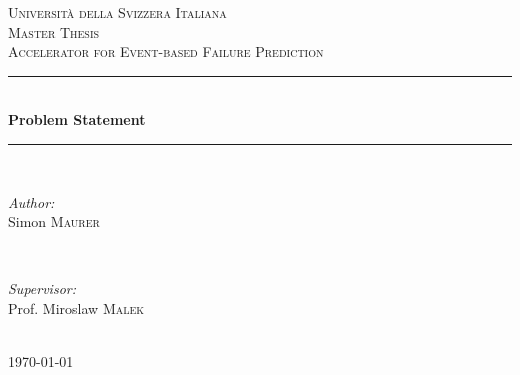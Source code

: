 \documentclass[12pt]{article} %
\begin{document}

\begin{titlepage}

\newcommand{\HRule}{\rule{\linewidth}{0.5mm}} %

\center %

\textsc{\LARGE Università della Svizzera Italiana}\\[1.5cm] %
\textsc{\Large Master Thesis}\\[0.5cm] %
\textsc{\large Accelerator for Event-based Failure Prediction}\\[0.5cm] %

\HRule \\[0.4cm]
{ \huge \bfseries Problem Statement}\\[0.4cm] %
\HRule \\[1.5cm]

\begin{minipage}{0.4\textwidth}
\begin{flushleft} \large
\emph{Author:}\\
Simon \textsc{Maurer} %
\end{flushleft}
\end{minipage}
~
\begin{minipage}{0.4\textwidth}
\begin{flushright} \large
\emph{Supervisor:} \\
Prof. Miroslaw \textsc{Malek} %
\end{flushright}
\end{minipage}\\[4cm]

{\large \today}\\[3cm] %

\vfill %

\end{titlepage}

\end{document}
